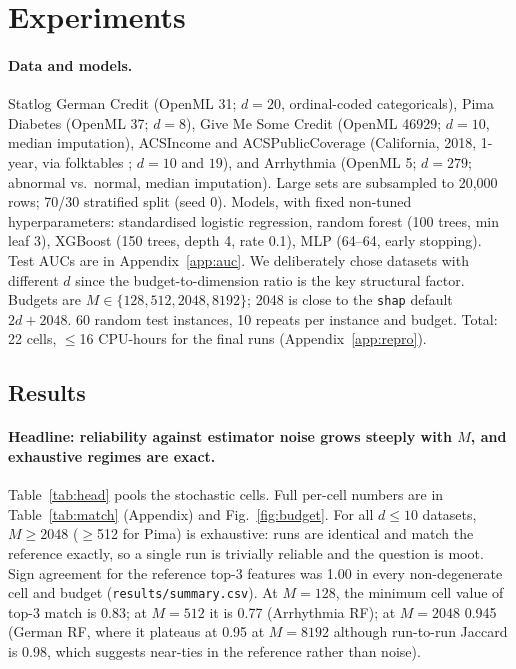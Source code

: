 \documentclass{article}
\begin{document}
\section{Experiments}
\paragraph{Data and models.} Statlog German Credit (OpenML 31; $d{=}20$, ordinal-coded categoricals), Pima Diabetes (OpenML 37; $d{=}8$), Give Me Some Credit (OpenML 46929; $d{=}10$, median imputation), ACSIncome and ACSPublicCoverage (California, 2018, 1-year, via folktables \citep{ding2021}; $d{=}10$ and $19$), and Arrhythmia (OpenML 5; $d{=}279$; abnormal vs.\ normal, median imputation). Large sets are subsampled to 20{,}000 rows; 70/30 stratified split (seed 0). Models, with fixed non-tuned hyperparameters: standardised logistic regression, random forest (100 trees, min leaf 3), XGBoost (150 trees, depth 4, rate 0.1), MLP (64--64, early stopping). Test AUCs are in Appendix~\ref{app:auc}. We deliberately chose datasets with different $d$ since the budget-to-dimension ratio is the key structural factor. Budgets are $M\in\{128,512,2048,8192\}$; 2048 is close to the \texttt{shap} default $2d{+}2048$. 60 random test instances, 10 repeats per instance and budget. Total: 22 cells, $\le$16 CPU-hours for the final runs (Appendix~\ref{app:repro}).

\subsection{Results}
\paragraph{Headline: reliability against estimator noise grows steeply with $M$, and exhaustive regimes are exact.} Table~\ref{tab:head} pools the stochastic cells. Full per-cell numbers are in Table~\ref{tab:match} (Appendix) and Fig.~\ref{fig:budget}. For all $d\le 10$ datasets, $M\ge 2048$ ($\ge$512 for Pima) is exhaustive: runs are identical and match the reference exactly, so a single run is trivially reliable and the question is moot. Sign agreement for the reference top-3 features was 1.00 in every non-degenerate cell and budget (\texttt{results/summary.csv}). At $M{=}128$, the minimum cell value of top-3 match is 0.83; at $M{=}512$ it is 0.77 (Arrhythmia RF); at $M{=}2048$ 0.945 (German RF, where it plateaus at 0.95 at $M{=}8192$ although run-to-run Jaccard is 0.98, which suggests near-ties in the reference rather than noise).
\end{document}
